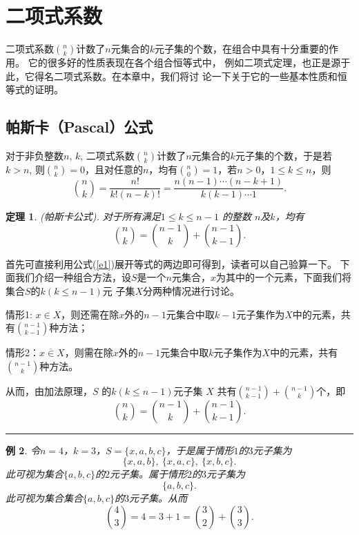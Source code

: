 \documentclass[a4paper,11pt]{article}
\newtheorem{thm}{定理}[section]
\newtheorem{exa}[thm]{例}
\def\qed{\nopagebreak\hfill{\rule{4pt}{7pt}}\medbreak}
\begin{document}
%




\section{二项式系数}

二项式系数${n \choose
k}$计数了$n$元集合的$k$元子集的个数，在组合中具有十分重要的作用。
它的很多好的性质表现在各个组合恒等式中，
例如二项式定理，也正是源于此，它得名二项式系数。在本章中，我们将讨
论一下关于它的一些基本性质和恒等式的证明。

\subsection{帕斯卡（Pascal）公式}
对于非负整数$n$, $k$, 二项式系数${n \choose
k}$计数了$n$元集合的$k$元子集的个数，于是若 $k>n$, 则${n \choose
k}=0$，且对任意的$n$，均有${n \choose 0}=1$，若$n>0$，$1\leq k \leq
n$，则
\begin{equation}\label{e1}
{n \choose k}=\frac{n!}{k!(n-k)!}=\frac{n(n-1)\cdots
(n-k+1)}{k(k-1)\cdots 1}.
\end{equation}
\begin{thm}
(帕斯卡公式). 对于所有满足$1\leq k\leq n-1$ 的整数 $n$及$k$，均有
\begin{equation}\label{e2}
{n\choose k}={n-1 \choose k}+{n-1\choose k-1}.
\end{equation}
\end{thm}
首先可直接利用公式(\ref{e1})展开等式的两边即可得到，读者可以自己验算一下。
下面我们介绍一种组合方法，设$S$是一个$n$元集合，$x$为其中的一个元素，下面我们将集合$S$的$k(k\leq
n-1)$元 子集$X$分两种情况进行讨论。

情形1: $x\in
X$，则还需在除$x$外的$n-1$元集合中取$k-1$元子集作为$X$中的元素，共有${n-1
\choose k-1}$种方法；

情形2：$x\overline{\in}
X$，则需在除$x$外的$n-1$元集合中取$k$元子集作为$X$中的元素，共有${n-1
\choose k}$种方法。

从而，由加法原理，$S$ 的$k(k\leq n-1)$元子集 $X$ 共有${n-1 \choose
k-1}+{n-1 \choose k}$个，即
$${n\choose k}={n-1 \choose k}+{n-1\choose k-1}.$$
\qed
\begin{exa}
令$n=4$，$k=3$，$S=\{x,a,b,c\}$，于是属于情形$1$的$3$元子集为$$\{x,a,b\},\
\{x,a,c\},\
\{x,b,c\}.$$此可视为集合$\{a,b,c\}$的$2$元子集。属于情形$2$的$3$元子集为$$\{a,b,c\}.$$
此可视为集合集合$\{a,b,c\}$的$3$元子集。从而$${4 \choose
3}=4=3+1={3\choose 2}+{3\choose 3}.$$
\end{exa}
\end{document}
